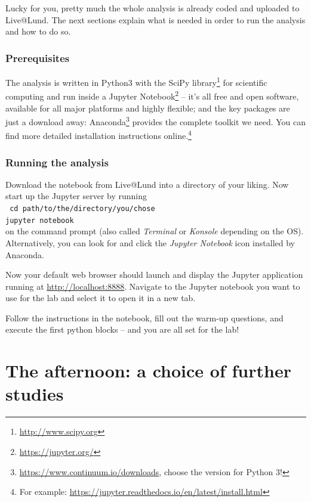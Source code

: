\documentclass[a4,11pt, notitlepage]{article}
\begin{document}
Lucky for you, pretty much the whole analysis is already coded and
uploaded to Live@Lund. The next
sections explain what is needed in order to run the analysis and how
to do so.

\subsubsection{Prerequisites}
\label{sec:prerequisites}

The analysis is written in Python3 with the SciPy
library\footnote{\url{http://www.scipy.org}} for scientific computing and run
inside a Jupyter Notebook\footnote{\url{https://jupyter.org/}} -- it's all
  free and open software, available for all major platforms and
  highly flexible; and the key packages are just a download away:
  Anaconda\footnote{\url{https://www.continuum.io/downloads}, choose the version
    for Python 3!} provides the complete toolkit we need.
  You can find more detailed installation instructions online.\footnote{For
  example: \url{https://jupyter.readthedocs.io/en/latest/install.html}}

\subsubsection{Running the analysis}
\label{sec:running-analysis}

Download the notebook from Live@Lund into a directory
of your liking. Now start up the Jupyter server by running\\
\texttt{\hphantom{35mm} cd path/to/the/directory/you/chose\\
\hphantom{35mm} jupyter notebook} \\
on the command prompt (also called \emph{Terminal} or \emph{Konsole}
depending on the OS). Alternatively, you can look for and click the \emph{Jupyter Notebook}
icon installed by Anaconda.

Now your default web browser should launch and display the Jupyter application
running at \url{http://localhost:8888}. Navigate to the Jupyter notebook you
want to use for the lab and select it to open it in a new tab.

Follow the instructions in the notebook, fill out the warm-up questions, and
execute the first python blocks -- and you are all set for the lab!


\section{The afternoon: a choice of further studies}
\label{sec:afternoon}
\end{document}
